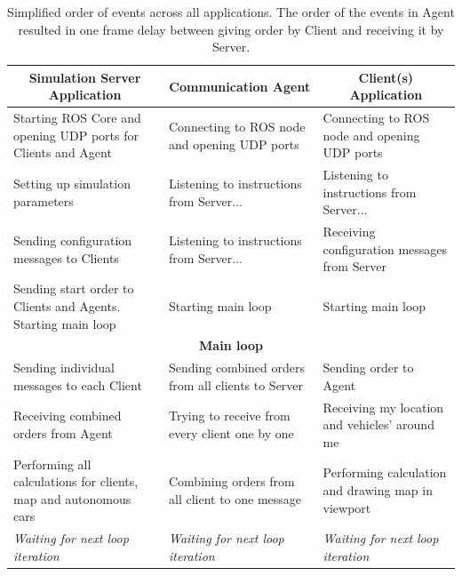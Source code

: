 \documentclass[11pt,english,twoside]{article}
\begin{document}
\begin{table}[]
\centering
\begin{tabular}{|m{4.4cm}|m{4.4cm}|m{4.4cm}|}
\hline
\multicolumn{1}{|c|}{\textbf{Simulation Server Application}}     & \multicolumn{1}{c|}{\textbf{Communication Agent}}  & \multicolumn{1}{c|}{\textbf{Client(s) Application}} \\ \hline
Starting ROS Core and opening UDP ports for Clients and Agent    & Connecting to ROS node and opening UDP ports       & Connecting to ROS node and opening UDP ports        \\ \hline
Setting up simulation parameters                                 & Listening to instructions from Server...           & Listening to instructions from Server...            \\ \hline
Sending configuration messages to Clients                       & Listening to instructions from Server...           & Receiving configuration messages from Server        \\ \hline
Sending start order to Clients and Agents. Starting main loop                       & Starting main loop                                 & Starting main loop                                  \\ \hline
\multicolumn{3}{|c|}{\textbf{Main loop}}                                                                                                                                    \\ \hline
Sending individual messages to each Client                       & Sending combined orders from all clients to Server & Sending order to Agent                              \\ \hline
Receiving combined orders from Agent                             & Trying to receive from every client one by one     & Receiving my location and vehicles' around me       \\ \hline
Performing all calculations for clients, map and autonomous cars & Combining orders from all client to one message    & Performing calculation and drawing map in viewport  \\ \hline
\textit{Waiting for next loop iteration}                         & \textit{Waiting for next loop iteration}           & \textit{Waiting for next loop iteration}            \\ \hline
\end{tabular}
\caption{Simplified order of events across all applications. The order of the events in Agent resulted in one frame delay between giving order by Client and receiving it by Server.}
\label{table:simple_events}
\end{table}
\end{document}
